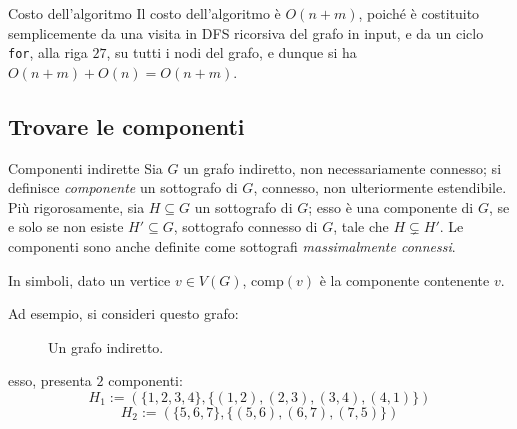 \documentclass[a4paper, 12pt]{report}
\begin{document}
    \begin{framedobs}{Costo dell'algoritmo}
        Il costo dell'algoritmo è $O(n + m)$, poiché è costituito semplicemente da una visita in DFS ricorsiva del grafo in input, e da un ciclo \texttt{for}, alla riga $27$, su tutti i nodi del grafo, e dunque si ha $O(n + m) + O(n) = O(n + m)$.
    \end{framedobs}

    \subsection{Trovare le componenti}

    \begin{frameddefn}{Componenti indirette}
        Sia $G$ un grafo indiretto, non necessariamente connesso; si definisce \textit{componente} un sottografo di $G$, connesso, non ulteriormente estendibile. Più rigorosamente, sia $H \subseteq G$ un sottografo di $G$; esso è una componente di $G$, se e solo se non esiste $H' \subseteq G$, sottografo connesso di $G$, tale che $H \subsetneq H'$. Le componenti sono anche definite come sottografi \textit{massimalmente connessi}.

        In simboli, dato un vertice $v \in V(G)$, $\mathrm{comp}(v)$ è la componente contenente $v$.
    \end{frameddefn}

    \begin{example}
        Ad esempio, si consideri questo grafo:

        \begin{figure}[H]
            \centering
            \caption{Un grafo indiretto.}
        \end{figure}

        esso, presenta $2$ componenti: $$H_1 := (\{1, 2, 3, 4\}, \{(1, 2), (2, 3), (3, 4), (4, 1)\})$$ $$H_2 := (\{5, 6, 7\}, \{(5, 6), (6, 7), (7, 5)\})$$
    \end{example}
\end{document}
